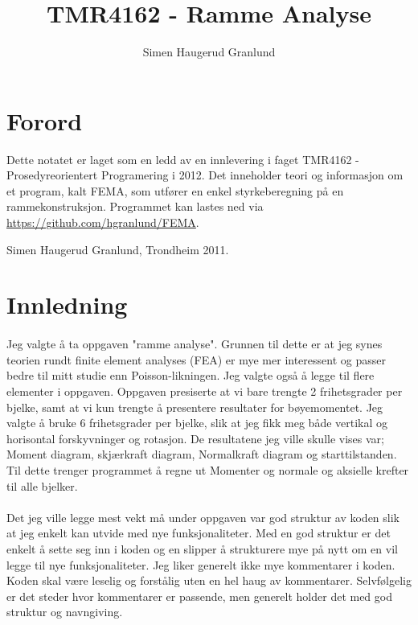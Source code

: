 \documentclass[10pt,a4paper, norsk]{article}
\author{Simen Haugerud Granlund}
\title{TMR4162 - Ramme Analyse}
\begin{document}
\maketitle
\lstset{language=C++,basicstyle=\footnotesize} %
\maketitle
\thispagestyle{empty} 	%
\newpage %

\section*{Forord}
Dette notatet er laget som en ledd av en innlevering i faget TMR4162 - Prosedyreorientert Programering i 2012. Det inneholder teori og informasjon om et program, kalt FEMA, som utfører en enkel styrkeberegning på en rammekonstruksjon. Programmet kan lastes ned via \url{https://github.com/hgranlund/FEMA}.
\begin{flushright}
Simen Haugerud Granlund, Trondheim 2011.
\end{flushright}
\newpage


\tableofcontents
\newpage
\section{Innledning}
\paragraph{}
Jeg valgte å ta oppgaven "ramme analyse". Grunnen til dette er at jeg synes teorien rundt finite element analyses (FEA) er mye mer interessent og passer bedre til mitt studie enn Poisson-likningen. Jeg valgte også å legge til flere elementer i oppgaven. Oppgaven presiserte at vi bare trengte 2 frihetsgrader per bjelke, samt at vi kun trengte å presentere resultater for bøyemomentet. Jeg valgte å bruke 6 frihetsgrader per bjelke, slik at jeg fikk meg både  vertikal og horisontal forskyvninger og rotasjon. De resultatene jeg ville skulle vises var; Moment diagram, skjærkraft diagram, Normalkraft diagram og starttilstanden. Til dette trenger programmet å regne ut Momenter og normale og aksielle krefter til alle bjelker.

\paragraph{}
Det jeg ville legge mest vekt må under oppgaven var god struktur av koden slik at jeg enkelt kan utvide med nye funksjonaliteter. Med en god struktur er det enkelt å sette seg inn i koden og en slipper å strukturere mye på nytt om en vil legge til nye funksjonaliteter. Jeg liker generelt ikke mye kommentarer i koden. Koden skal være leselig og forstålig uten en hel haug av kommentarer. Selvfølgelig er det steder hvor kommentarer er passende, men generelt holder det med god struktur og navngiving.
\end{document}
